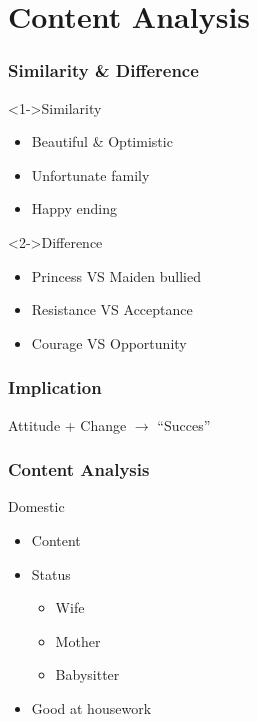 \documentclass{beamer}
\begin{document}
\section{Content Analysis}

\begin{frame}
    \frametitle{Similarity \& Difference}
    \begin{block}<1->{Similarity}
        \begin{itemize}
            \item Beautiful \& Optimistic
            \item Unfortunate family
            \item Happy ending
        \end{itemize}
    \end{block}
    \begin{block}<2->{Difference}
        \begin{itemize}
            \item Princess \alert{VS} Maiden bullied
            \item Resistance \alert{VS} Acceptance
            \item Courage \alert{VS} Opportunity
        \end{itemize}
    \end{block}
\end{frame}

\begin{frame}
    \frametitle{Implication}
    \huge{Attitude + Change $\rightarrow$ ``Succes''}
\end{frame}

\begin{frame}
    \frametitle{Content Analysis}
    \begin{block}{Domestic}
        \begin{itemize}
            \item Content
            \item Status
                  \begin{itemize}
                      \item Wife
                      \item Mother
                      \item Babysitter
                  \end{itemize}
            \item Good at housework
        \end{itemize}
    \end{block}
\end{frame}
\end{document}
